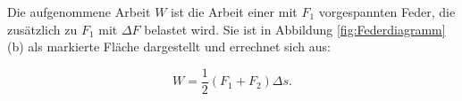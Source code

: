 Die aufgenommene Arbeit $W$ ist die Arbeit einer mit $F_1$ vorgespannten Feder, die zusätzlich zu $F_1$ mit $\Delta F$ belastet wird. Sie ist in Abbildung \ref{fig:Federdiagramm}(b) als markierte Fläche dargestellt und errechnet sich aus:

\begin{equation}
W = \frac{1}{2} (F_1 + F_2) \Delta s.
\label{Federarbeit}
\end{equation}


%












